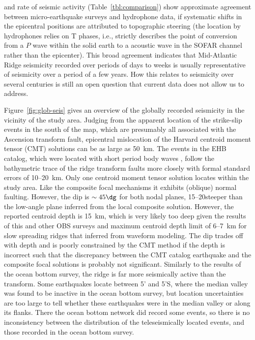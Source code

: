 \documentclass[jgr]{agu2001}
\newlength{\tw}
\begin{document}
\begin{article}
\citep[Fig.~13 of ][]{smith03} and rate of seismic
activity (Table~\ref{tbl:comparison}) show approximate agreement between
micro-earthquake surveys and hydrophone data, if systematic shifts in
the epicentral positions are attributed to topographic steering (the
location by hydrophones relies on T phases, i.e., strictly describes the
point of conversion from a $P$ wave within the solid earth to a
acoustic wave in the SOFAR channel rather than the epicenter).  This broad agreement indicates that
Mid-Atlantic Ridge seismicity recorded over periods of days to weeks is
usually representative of seismicity over a period of a few years.
How this relates to seismicity over several centuries is still
an open question that current data does not allow us to address.

Figure~\ref{fig:glob-seis} gives an overview of the globally recorded
seismicity in the vicinity of the study area. Judging from the
apparent location of the strike-slip events in the south of the map,
which are presumably all associated with the Ascension transform
fault, epicentral mislocation of the Harvard centroid moment tensor (CMT) solutions
\citep{dziewonski81a} can be as large as 50~km. The events 
in the EHB catalog, which were located with short period body waves
\citep{engdahl98}, follow the bathymetric trace of the ridge  transform
faults more closely with formal standard errors of 10--20~km.  Only
one centroid moment tensor solution locates within the study
area. Like the composite focal mechanisms it exhibits (oblique) normal
faulting. However, the dip is $\sim 45\dg$ for both nodal planes,
15--20\dg steeper than the low-angle plane inferred from the local
composite solution. However, the reported centroid depth is 15~km,
which is very likely too deep given the results of this and other OBS
surveys and  maximum centroid depth limit
of 6--7~km for slow spreading ridges that \citet{huang88} inferred  from waveform modeling. 
The dip trades off with depth and is poorly constrained by the CMT
method if the depth is incorrect
\citep{dziewonski81a} such that
the discrepancy between the CMT catalog earthquake and the composite focal
solutions is probably not significant. Similarly to the results of the
ocean bottom survey, the ridge is far more seismically active than the
transform.  Some earthquakes locate between 5' and 5'S,
where the median valley  was found to be inactive in the ocean bottom
survey, but location uncertainties are too large to tell whether these
earthquakes were in the median valley or along its flanks. There the
ocean bottom network did record some events, so there is no
inconsistency between the distribution of the teleseismically located
events, and those recorded in the ocean bottom
survey.


\end{article}
\end{document}
